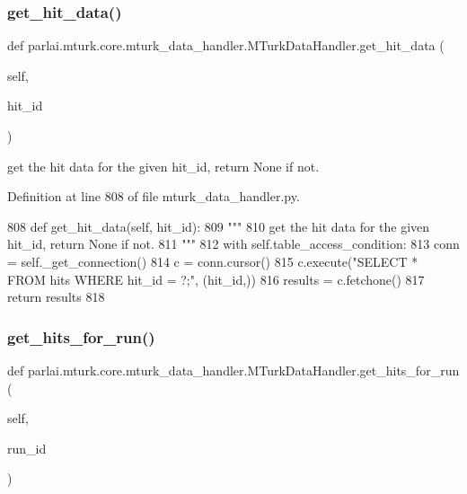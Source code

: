 \subsubsection{\texorpdfstring{get\+\_\+hit\+\_\+data()}{get\_hit\_data()}}
{\footnotesize\ttfamily def parlai.\+mturk.\+core.\+mturk\+\_\+data\+\_\+handler.\+M\+Turk\+Data\+Handler.\+get\+\_\+hit\+\_\+data (\begin{DoxyParamCaption}\item[{}]{self,  }\item[{}]{hit\+\_\+id }\end{DoxyParamCaption})}

\begin{DoxyVerb}get the hit data for the given hit_id, return None if not.
\end{DoxyVerb}
 

Definition at line 808 of file mturk\+\_\+data\+\_\+handler.\+py.


\begin{DoxyCode}
808     \textcolor{keyword}{def }get\_hit\_data(self, hit\_id):
809         \textcolor{stringliteral}{"""}
810 \textcolor{stringliteral}{        get the hit data for the given hit\_id, return None if not.}
811 \textcolor{stringliteral}{        """}
812         with self.table\_access\_condition:
813             conn = self.\_get\_connection()
814             c = conn.cursor()
815             c.execute(\textcolor{stringliteral}{"SELECT * FROM hits WHERE hit\_id = ?;"}, (hit\_id,))
816             results = c.fetchone()
817             \textcolor{keywordflow}{return} results
818 
\end{DoxyCode}
\mbox{\label{classparlai_1_1mturk_1_1core_1_1mturk__data__handler_1_1MTurkDataHandler_a9f4e9c9bec7d5d47efd4492dfb751b5c}} 
\subsubsection{\texorpdfstring{get\+\_\+hits\+\_\+for\+\_\+run()}{get\_hits\_for\_run()}}
{\footnotesize\ttfamily def parlai.\+mturk.\+core.\+mturk\+\_\+data\+\_\+handler.\+M\+Turk\+Data\+Handler.\+get\+\_\+hits\+\_\+for\+\_\+run (\begin{DoxyParamCaption}\item[{}]{self,  }\item[{}]{run\+\_\+id }\end{DoxyParamCaption})}

